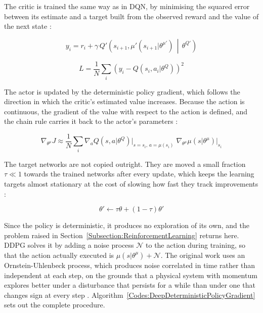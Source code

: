 The critic is trained the same way as in DQN, by minimising the squared error between its estimate and a target built from the observed reward and the value of the next state \cite{lillicrap_continuous_2015}:

\begin{equation}
y_i = r_i + \gamma \, Q'\!\left(s_{i+1}, \mu'(s_{i+1} | \theta^{\mu'}) \,\middle|\, \theta^{Q'}\right)
\label{Equation:DDPGTarget}
\end{equation}

\begin{equation}
L = \frac{1}{N} \sum_{i} \left( y_i - Q(s_i, a_i | \theta^{Q}) \right)^2
\label{Equation:DDPGCriticLoss}
\end{equation}

The actor is updated by the deterministic policy gradient, which follows the direction in which the critic's estimated value increases. Because the action is continuous, the gradient of the value with respect to the action is defined, and the chain rule carries it back to the actor's parameters \cite{lillicrap_continuous_2015}:

\begin{equation}
\nabla_{\theta^{\mu}} J \approx \frac{1}{N} \sum_{i} \nabla_{a} Q(s, a | \theta^{Q}) \big|_{s = s_i,\, a = \mu(s_i)} \; \nabla_{\theta^{\mu}} \mu(s | \theta^{\mu}) \big|_{s_i}
\label{Equation:DeterministicPolicyGradient}
\end{equation}

The target networks are not copied outright. They are moved a small fraction \( \tau \ll 1 \) towards the trained networks after every update, which keeps the learning targets almost stationary at the cost of slowing how fast they track improvements \cite{lillicrap_continuous_2015}:

\begin{equation}
\theta' \leftarrow \tau \theta + (1 - \tau) \theta'
\label{Equation:SoftUpdate}
\end{equation}

Since the policy is deterministic, it produces no exploration of its own, and the problem raised in Section~\ref{Subsection:ReinforcementLearning} returns here. DDPG solves it by adding a noise process \( \mathcal{N} \) to the action during training, so that the action actually executed is \( \mu(s | \theta^{\mu}) + \mathcal{N} \). The original work uses an Ornstein-Uhlenbeck process, which produces noise correlated in time rather than independent at each step, on the grounds that a physical system with momentum explores better under a disturbance that persists for a while than under one that changes sign at every step \cite{lillicrap_continuous_2015}. Algorithm~\ref{Codes:DeepDeterministicPolicyGradient} sets out the complete procedure.

